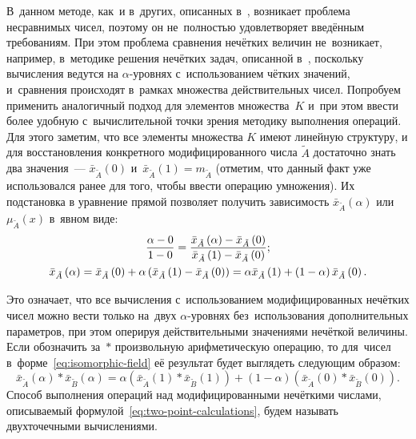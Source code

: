 В~данном методе, как~и в~других, описанных в~\cite{Vorontsov_Compare}, возникает проблема несравнимых чисел, поэтому он не~полностью удовлетворяет введённым требованиям. При этом проблема сравнения нечётких величин не~возникает, например, в~методике решения нечётких задач, описанной в~\cite{Lebedev}, поскольку вычисления ведутся на $\alpha$-уровнях с~использованием чётких значений, и~сравнения происходят в~рамках множества действительных чисел. Попробуем применить аналогичный подход для элементов множества~$K$ и~при этом ввести более удобную с~вычислительной точки зрения методику выполнения операций. Для этого заметим, что все элементы множества $K$ имеют линейную структуру, и для восстановления конкретного модифицированного числа $\tilde{A}$ достаточно знать два значения~--- $\bar{x}_{\tilde A}\left( 0 \right)$ и~$\bar{x}_{\tilde A}\left( 1 \right)=m_{\tilde A}$ (отметим, что данный факт уже использовался ранее для того, чтобы ввести операцию умножения). Их подстановка в уравнение прямой позволяет получить зависимость $\bar{x}_{\tilde A}\left( \alpha \right)$ или $\mu_{\tilde A}\left( x \right)$ в~явном виде:
\begin{gather}
  \frac{\alpha-0}{1-0}=\frac{\bar{x}_{\tilde A}\left( \alpha  \right)-\bar{x}_{\tilde A}\left( 0 \right)}{\bar{x}_{\tilde A}\left( 1 \right)-\bar{x}_{\tilde A}\left( 0 \right)}; \notag \\
  \label{eq:isomorphic-field}
  \bar{x}_{\tilde A}\left( \alpha \right)=\bar{x}_{\tilde A}\left( 0 \right)+\alpha \left(\bar{x}_{\tilde A}\left( 1 \right)-\bar{x}_{\tilde A}\left(0 \right) \right)=\alpha \bar{x}_{\tilde A}\left( 1 \right)+\left( 1-\alpha  \right) \bar{x}_{\tilde A}\left( 0 \right).
\end{gather}

Это означает, что все вычисления с~использованием модифицированных нечётких чисел можно вести только на~двух $\alpha$-уровнях  без~использования дополнительных параметров, при этом оперируя действительными значениями нечёткой величины. Если обозначить за~$*$ произвольную арифметическую операцию, то для~чисел в~форме~\eqref{eq:isomorphic-field} её результат будет выглядеть следующим образом:
\begin{equation}
\label{eq:two-point-calculations}
  \bar{x}_{\tilde A}\left( \alpha \right)*\bar{x}_{\tilde B}\left(\alpha \right)=\alpha \left(\bar{x}_{\tilde A}\left( 1 \right)*\bar{x}_{\tilde B}\left(1 \right) \right)+\left(1-\alpha \right)\left(\bar{x}_{\tilde A}\left(0 \right)*\bar{x}_{\tilde B}\left(0 \right) \right).
\end{equation}
Способ выполнения операций над модифицированными нечёткими числами, описываемый формулой~\eqref{eq:two-point-calculations}, будем называть двухточечными вычислениями.

